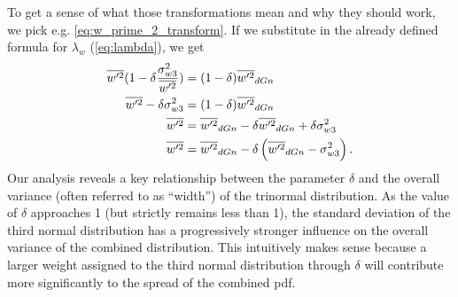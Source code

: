 To get a sense of what those transformations mean and why they should work,
we pick e.g. \cref{eq:w_prime_2_transform}.
If we substitute in the already defined formula for $\lambda_w$ (\cref{eq:lambda}), we get
\begin{align}
    \overline{w'^2} (1 - \delta\frac{\sigma_{w 3}^2}{\overline{w'^2}})
    &= (1 - \delta)\overline{w'^2}_{dGn} \nonumber\\
    \overline{w'^2} - \delta\sigma_{w 3}^2
    &= (1 - \delta)\overline{w'^2}_{dGn} \nonumber\\
    \overline{w'^2}
    &= \overline{w'^2}_{dGn} - \delta\overline{w'^2}_{dGn} + \delta\sigma_{w 3}^2 \nonumber\\
    \overline{w'^2}
    &= \overline{w'^2}_{dGn} - \delta\left(\overline{w'^2}_{dGn} - \sigma_{w 3}^2\right).
\end{align}
Our analysis reveals a key relationship between the parameter $\delta$
and the overall variance (often referred to as \enquote{width}) of the trinormal distribution.
As the value of $\delta$ approaches 1 (but strictly remains less than 1),
the standard deviation of the third normal distribution
has a progressively stronger influence on the overall variance of the combined distribution.
This intuitively makes sense because a larger weight assigned to the third normal distribution through $\delta$
will contribute more significantly to the spread of the combined \gls{pdf}.


